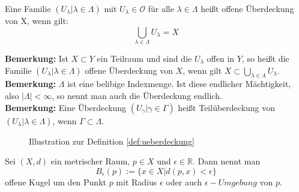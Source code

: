 \begin{Def}\label{def:ueberdeckung}
	Eine Familie \( (U_{\lambda} | \lambda \in \Lambda) \) mit \(U_{\lambda} \in \mathcal{O} \) für alle \( \lambda \in \Lambda \) heißt 	offene Überdeckung von X, wenn gilt:
	\[ \bigcup_{\lambda \in \Lambda } U_{\lambda} = X \]
\end{Def}
\textbf{Bemerkung:} Ist \(X \subset Y\) ein Teilraum und sind die \(U_{\lambda}\) offen in \(Y\), so heißt die Familie \( (U_{\lambda} | \lambda \in \Lambda) \) offene Überdeckung von
\(X\), wenn gilt \(X \subset \bigcup_{\lambda \in \Lambda} U_{\lambda}\).
\\
\textbf{Bemerkung:} \(\Lambda\) ist eine belibige Indexmenge. Ist diese endlicher Mächtigkeit, also \(|\Lambda| < \infty\), so nennt man auch die Überdeckung endlich. 
\\
\textbf{Bemerkung:} Eine Überdeckung \( (U_{\gamma} | \gamma \in \Gamma) \)  heißt Teilüberdeckung von \( (U_{\lambda} | \lambda \in \Lambda ) \), wenn \(\Gamma \subset \Lambda\). 

\begin{figure}[ht]%
	\centering
	\def\svgwidth{150}
	
	\caption{Illustration zur Definition \ref{def:ueberdeckung}}
	\label{fig:ueberdeckung}
\end{figure}

\begin{Def}
	Sei \((X,d)\) ein metrischer Raum, \(p \in X\) und \(\epsilon \in \mathbb{R}\). Dann nennt man
	\[ B_{\epsilon}(p) := \{ x \in X | d(p,x) < \epsilon \} \]
	offene Kugel um den Punkt \(p\) mit Radius \(\epsilon\) oder auch \(\epsilon-Umgebung\) von \(p\).
\end{Def}

